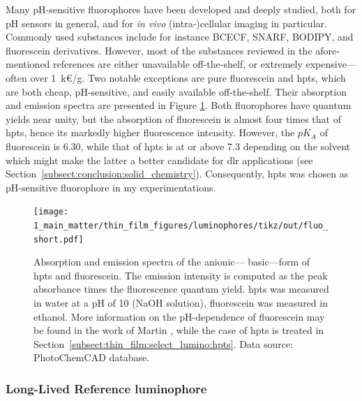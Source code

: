 Many pH-sensitive fluorophores have been developed and deeply studied, both for pH sensors in general\cite{wencel2014}, and for \emph{in vivo} (intra-)cellular imaging in particular\cite{han2010fluo}. Commonly used substances include for instance BCECF, SNARF, BODIPY, and fluorescein derivatives\cite{han2010fluo, boens2012, leguern2020}. However, most of the substances reviewed in the afore-mentioned references are either unavailable off-the-shelf, or extremely expensive---\ie{} often over 1~k\euro/g. Two notable exceptions are pure fluorescein and \gls{hpts}, which are both cheap, pH-sensitive, and easily available off-the-shelf. Their absorption and emission spectra are presented in Figure \ref{fig:thin_film:select_lumino:hpts_fluorescein}. Both fluorophores have quantum yields near unity, but the absorption of fluorescein is almost four times that of \gls{hpts}, hence its markedly higher fluorescence intensity. However, the $pK_A$ of fluorescein is 6.30\cite{lavis2007}, while that of \gls{hpts} is at or above 7.3 depending on the solvent\cite{wolfbeis1983, tranthi2002, sabnis2015} which might make the latter a better candidate for \gls{dlr} applications (see Section~\ref{subsect:conclusion:solid_chemistry}). Consequently, \gls{hpts} was chosen as pH-sensitive fluorophore in my experimentations.

\begin{figure}
	\centering
	\texttt{[image: 1\_main\_matter/thin\_film\_figures/luminophores/tikz/out/fluo\_short.pdf]}
	\caption[Absorption and emission spectra of the anionic---\ie{} basic---form of \gls{hpts} and fluorescein.]{Absorption and emission spectra of the anionic---\ie{} basic---form of \gls{hpts} and fluorescein. The emission intensity is computed as the peak absorbance times the fluorescence quantum yield. \gls{hpts} was measured in water at a pH of 10 (NaOH solution), fluorescein was measured in ethanol. More information on the pH-dependence of fluorescein may be found in the work of Martin \etal{}\cite{martin1975}, while the case of \gls{hpts} is treated in Section~\ref{subsect:thin_film:select_lumino:hpts}. Data source: PhotoChemCAD database\cite{taniguchi2018b}.}
	\label{fig:thin_film:select_lumino:hpts_fluorescein}
\end{figure}


\subsubsection{Long-Lived Reference luminophore}

